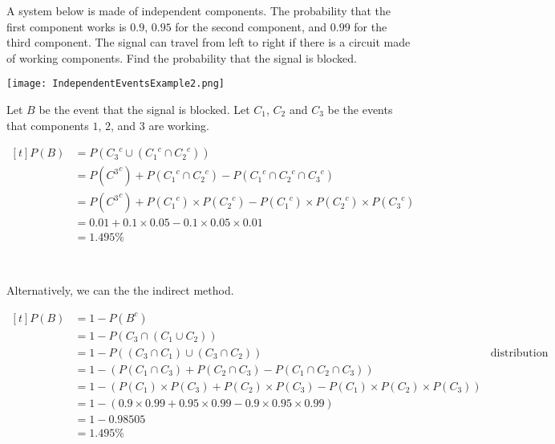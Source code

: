 \begin{example}
    A system below is made of independent components. The probability that the first component works is $0.9$, $0.95$ for the second component, and $0.99$ for the third component. The signal can travel from left to right if there is a circuit made of working components. Find the probability that the signal is blocked.

    \begin{center} \texttt{[image: IndependentEventsExample2.png]} \end{center}

    Let $B$ be the event that the signal is blocked. Let $C_1$, $C_2$ and $C_3$ be the events that components $1$, $2$, and $3$ are working. 

    $\begin{aligned}[t]
        P(B) & = P({C_3}^c \cup ({C_1}^c \cap {C_2}^c))                                                     \\
             & = P({C^3}^c) + P({C_1}^c \cap {C_2}^c) - P({C_1}^c \cap {C_2}^c \cap {C_3}^c)                \\
             & = P({C^3}^c) + P({C_1}^c) \times P({C_2}^c) - P({C_1}^c) \times P({C_2}^c) \times P({C_3}^c) \\
             & = 0.01 + 0.1 \times 0.05 - 0.1 \times 0.05 \times 0.01                                       \\
             & = 1.495 \%
    \end{aligned}$
    
    {~~~}

    Alternatively, we can the the indirect method. 

    $\begin{aligned}[t]
        P(B) & = 1 - P(B^c)                                                                                                                    \\
             & = 1 - P(C_3 \cap (C_1 \cup C_2))                                                                                                \\
             & = 1 - P((C_3 \cap C_1) \cup (C_3 \cap C_2))                                                           & \text{distribution law} \\
             & = 1 - \left( P(C_1 \cap C_3) + P(C_2 \cap C_3) - P(C_1 \cap C_2 \cap C_3) \right)                                               \\
             & = 1 - \left( P(C_1) \times P(C_3) + P(C_2) \times P(C_3) - P(C_1) \times P(C_2) \times P(C_3) \right)                           \\
             & = 1 - (0.9 \times 0.99 + 0.95 \times 0.99 - 0.9 \times 0.95 \times 0.99)                                                        \\
             & = 1 - 0.98505                                                                                                                   \\
             & = 1.495 \%
    \end{aligned}$
\end{example}

